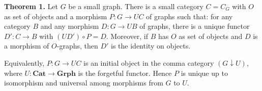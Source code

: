 \textbf{Theorem 1.} Let $G$ be a small graph. There is a small category $C = C_G$ with $O$ as set of objects and a morphism $P: G \to UC$ of graphs such that: for any category $B$ and any morphism $D: G \to UB$ of graphs, there is a unique functor $D': C \to B$ with $(UD') \circ P = D$. Moreover, if $B$ has $O$ as set of objects and $D$ is a morphism of $O$-graphs, then $D'$ is the identity on objects.

Equivalently, $P: G \to UC$ is an initial object in the comma category $(G \downarrow U)$, where $U: \mathbf{Cat} \to \mathbf{Grph}$ is the forgetful functor. Hence $P$ is unique up to isomorphism and universal among morphisms from $G$ to $U$.
